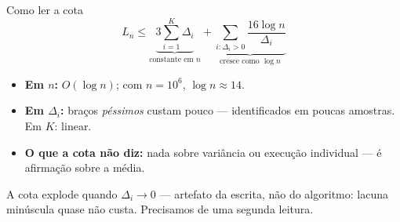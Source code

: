 \documentclass[aspectratio=169, 11pt]{beamer}
\begin{document}
\begin{frame}{Como ler a cota}
  \[
    L_n \le \underbrace{3\sum_{i=1}^{K}\Delta_i}_{\text{constante em }n}
      + \underbrace{\sum_{i:\Delta_i>0}\frac{16\log n}{\Delta_i}}_{\text{cresce como }\log n}
  \]
  \vspace{-0.4em}
  {\small
  \begin{itemize}\setlength{\itemsep}{0.2ex}
    \item \textbf{Em $n$:} $O(\log n)$; com $n=10^{6}$, $\log n \approx 14$.
    \item \textbf{Em $\Delta_i$:} braços \emph{péssimos} custam pouco ---
          identificados em poucas amostras. Em $K$: linear.
    \item \textbf{O que a cota não diz:} nada sobre variância ou execução
          individual --- é afirmação sobre a média.
  \end{itemize}}

  \begin{alertabox}
    A cota \alert{explode quando $\Delta_i\to 0$} --- artefato da escrita, não
    do algoritmo: lacuna minúscula quase não custa. Precisamos de uma segunda
    leitura.
  \end{alertabox}
\end{frame}
\end{document}
